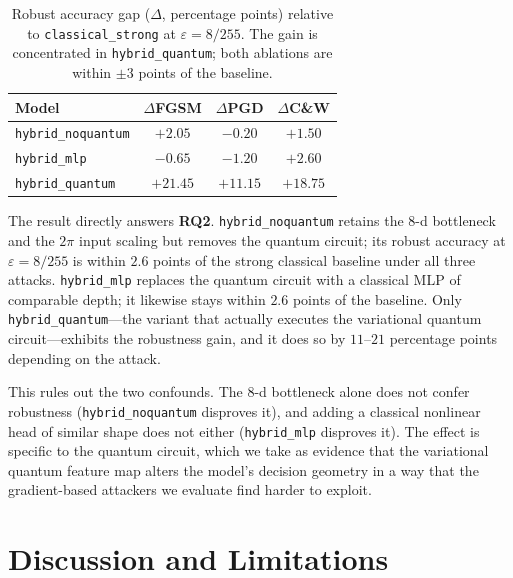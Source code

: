 \documentclass[11pt]{article}
\newcommand{\eps}{\varepsilon}
\begin{document}
\begin{table}[t]
\centering
\caption{Robust accuracy gap ($\Delta$, percentage points) relative to
\texttt{classical\_strong} at $\eps = 8/255$. The gain is concentrated in
\texttt{hybrid\_quantum}; both ablations are within $\pm 3$ points of the
baseline.}
\label{tab:ablation_delta}
\begin{tabular}{lccc}
\toprule
Model & $\Delta$FGSM & $\Delta$PGD & $\Delta$C\&W \\
\midrule
\texttt{hybrid\_noquantum}    & $+2.05$  & $-0.20$  & $+1.50$ \\
\texttt{hybrid\_mlp}           & $-0.65$  & $-1.20$  & $+2.60$ \\
\texttt{hybrid\_quantum}       & $+21.45$ & $+11.15$ & $+18.75$ \\
\bottomrule
\end{tabular}
\end{table}

The result directly answers \textbf{RQ2}. \texttt{hybrid\_noquantum}
retains the 8-d bottleneck and the $2\pi$ input scaling but removes the
quantum circuit; its robust accuracy at $\eps=8/255$ is within
$2.6$ points of the strong classical baseline under all three attacks.
\texttt{hybrid\_mlp} replaces the quantum circuit with a classical MLP of
comparable depth; it likewise stays within $2.6$ points of the baseline.
Only \texttt{hybrid\_quantum}---the variant that actually executes the
variational quantum circuit---exhibits the robustness gain, and it does
so by $11$--$21$ percentage points depending on the attack.

This rules out the two confounds. The 8-d bottleneck alone does not
confer robustness (\texttt{hybrid\_noquantum} disproves it), and adding
a classical nonlinear head of similar shape does not either
(\texttt{hybrid\_mlp} disproves it). The effect is specific to the
quantum circuit, which we take as evidence that the variational quantum
feature map alters the model's decision geometry in a way that the
gradient-based attackers we evaluate find harder to exploit.

\section{Discussion and Limitations}
\label{sec:discussion}

\end{document}
